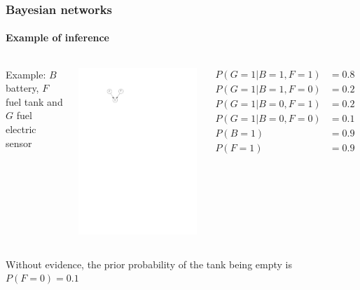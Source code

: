 \documentclass[slidestop,compress,mathserif]{beamer}
\begin{document}
\begin{frame}
	\frametitle{Bayesian networks}
	\framesubtitle{Example of inference}
     \begin{columns}
    \column[c]{6cm}
    Example: $B$ battery, $F$ fuel tank and $G$ fuel electric sensor
    \begin{center}
    \includegraphics[width=.4\textwidth]{fuel0}
    \end{center}
    \column[c]{6cm}
    \begin{align*}
    P(G=1|B=1,F=1) & = 0.8\\
    P(G=1|B=1,F=0) & = 0.2\\
    P(G=1|B=0,F=1) & = 0.2\\
    P(G=1|B=0,F=0) & = 0.1\\
    P(B=1) & = 0.9\\
    P(F=1) & = 0.9
    \end{align*}
    \end{columns}
    Without evidence, the prior probability of the tank being empty is $P(F=0)=0.1$
\end{frame}
\end{document}
